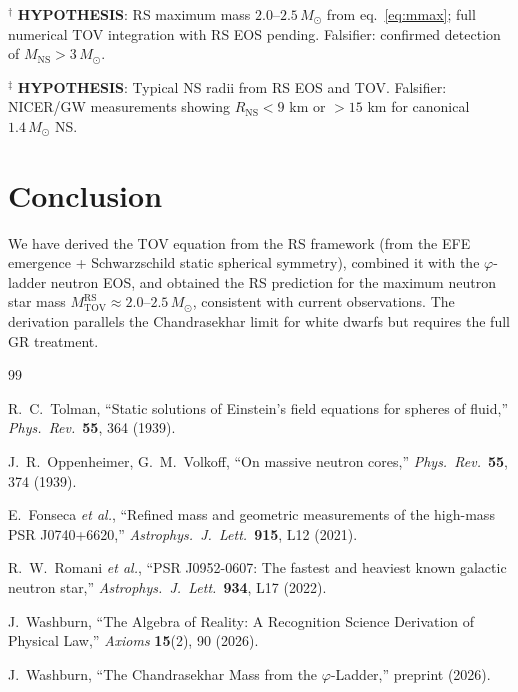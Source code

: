 \documentclass[12pt,a4paper]{article}
\theoremstyle{definition}
\theoremstyle{remark}
\begin{document}
$^\dagger$ \textbf{HYPOTHESIS}: RS maximum mass $2.0$--$2.5\,M_\odot$
from eq.~\eqref{eq:mmax}; full numerical TOV integration with RS EOS pending.
Falsifier: confirmed detection of $M_\mathrm{NS} > 3\,M_\odot$.

$^\ddagger$ \textbf{HYPOTHESIS}: Typical NS radii from RS EOS and TOV.
Falsifier: NICER/GW measurements showing $R_\mathrm{NS} < 9$ km or
$> 15$ km for canonical $1.4\,M_\odot$ NS.

\section{Conclusion}
\label{sec:conclusion}

We have derived the TOV equation from the RS framework (from the
EFE emergence + Schwarzschild static spherical symmetry), combined it
with the $\varphi$-ladder neutron EOS, and obtained the RS prediction
for the maximum neutron star mass $M_\mathrm{TOV}^\mathrm{RS} \approx
2.0$--$2.5\,M_\odot$, consistent with current observations.  The
derivation parallels the Chandrasekhar limit for white dwarfs but
requires the full GR treatment.

\begin{thebibliography}{99}

R.~C.~Tolman, ``Static solutions of Einstein's field equations for
spheres of fluid,'' \textit{Phys.\ Rev.}\ \textbf{55}, 364 (1939).

J.~R.~Oppenheimer, G.~M.~Volkoff, ``On massive neutron cores,''
\textit{Phys.\ Rev.}\ \textbf{55}, 374 (1939).

E.~Fonseca \textit{et al.}, ``Refined mass and geometric measurements
of the high-mass PSR J0740+6620,'' \textit{Astrophys.\ J.\ Lett.}\
\textbf{915}, L12 (2021).

R.~W.~Romani \textit{et al.}, ``PSR J0952-0607: The fastest and heaviest
known galactic neutron star,'' \textit{Astrophys.\ J.\ Lett.}\
\textbf{934}, L17 (2022).

J.~Washburn, ``The Algebra of Reality: A Recognition Science Derivation
of Physical Law,'' \textit{Axioms} \textbf{15}(2), 90 (2026).

J.~Washburn, ``The Chandrasekhar Mass from the $\varphi$-Ladder,''
preprint (2026).

\end{thebibliography}
\end{document}
